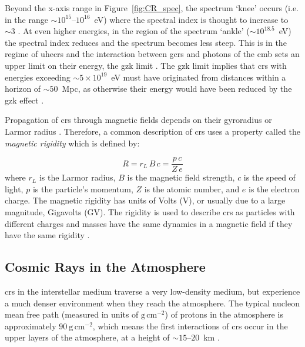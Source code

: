 Beyond the x-axis range in Figure~\ref{fig:CR_spec}, the spectrum `knee' occurs (i.e. in the range $\sim10^{15}$--$10^{16}$~eV) where the spectral index is thought to increase to $\sim3$ \citep{particle_data_group_review_2020}. At even higher energies, in the region of the spectrum `ankle' ($\sim10^{18.5}$~eV) the spectral index reduces and the spectrum becomes less steep. This is in the regime of \glspl{uhecr} and the interaction between \glspl{gcr} and photons of the \gls{cmb} sets an upper limit on their energy, the \gls{gzk} limit \citep{particle_data_group_review_2020}. The \gls{gzk} limit implies that \glspl{cr} with energies exceeding $\sim5\times10^{19}$~eV must have originated from distances within a horizon of $\sim50$~Mpc, as otherwise their energy would have been reduced by the \gls{gzk} effect \citep{particle_data_group_review_2020}. 


Propagation of \glspl{cr} through magnetic fields depends on their gyroradius or Larmor radius \citep{particle_data_group_review_2020}. Therefore, a common description of \glspl{cr} uses a property called the {\textit{magnetic rigidity}} which is defined by:

\begin{equation}
\label{eq:rigidity}
R = r_L \, B \, c = \frac{p \, c}{Z \, e}
\end{equation}
%
where $r_L$ is the Larmor radius, $B$ is the magnetic field strength, $c$ is the speed of light, $p$ is the particle's momentum, $Z$ is the atomic number, and $e$ is the electron charge. The magnetic rigidity has units of Volts (V), or usually due to a large magnitude, Gigavolts (GV). The rigidity is used to describe \glspl{cr} as particles with different charges and masses have the same dynamics in a magnetic field if they have the same rigidity \citep{particle_data_group_review_2020}.



\subsection{Cosmic Rays in the Atmosphere}
\label{sec:air_shower}

\glspl{cr} in the interstellar medium traverse a very low-density medium, but experience a much denser environment when they reach the atmosphere. The typical nucleon mean free path (measured in units of $\mathrm{g}\,\mathrm{cm}^{-2}$) of protons in the atmosphere is approximately $90~\mathrm{g}\,\mathrm{cm}^{-2}$, which means the first interactions of \glspl{cr} occur in the upper layers of the atmosphere, at a height of $\sim15$--$20$~km \citep{grupen_astroparticle_2005}. %

